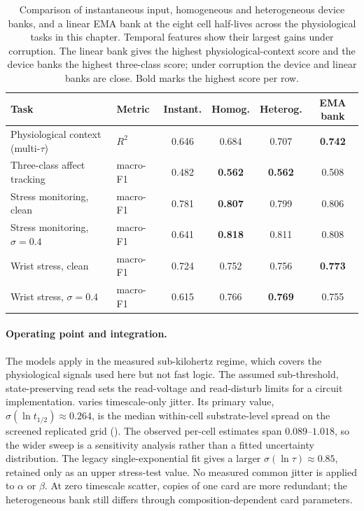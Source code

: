 \documentclass[12pt, twoside]{report}
\begin{document}
\begin{table}[t]
  \centering
  \small
  \caption[Fading memory, timescale spread, and linear controls across the physiological tasks]{Comparison of instantaneous input, homogeneous and heterogeneous device banks, and a linear EMA bank at the eight cell half-lives across the physiological tasks in this chapter. Temporal features show their largest gains under corruption. The linear bank gives the highest physiological-context score and the device banks the highest three-class score; under corruption the device and linear banks are close. Bold marks the highest score per row.}
  \label{tab:ch5_summary}
  \setlength{\tabcolsep}{4pt}
  \begin{tabularx}{\linewidth}{@{}>{\raggedright\arraybackslash}Xlcccc@{}}
    \toprule
    Task & Metric & Instant. & Homog. & Heterog. & EMA bank \\
    \midrule
    Physiological context (multi-$\tau$) & $R^2$       & 0.646 & 0.684 & 0.707 & \textbf{0.742} \\
    Three-class affect tracking          & macro-F1    & 0.482 & \textbf{0.562} & \textbf{0.562} & 0.508 \\
    Stress monitoring, clean             & macro-F1    & 0.781 & \textbf{0.807} & 0.799 & 0.806 \\
    Stress monitoring, $\sigma{=}0.4$    & macro-F1    & 0.641 & \textbf{0.818} & 0.811 & 0.808 \\
    Wrist stress, clean                  & macro-F1    & 0.724 & 0.752 & 0.756 & \textbf{0.773} \\
    Wrist stress, $\sigma{=}0.4$         & macro-F1    & 0.615 & 0.766 & \textbf{0.769} & 0.755 \\
    \bottomrule
  \end{tabularx}
\end{table}

\paragraph{Operating point and integration.} The models apply in the measured sub-kilohertz regime, which covers the physiological signals used here but not fast logic. The assumed sub-threshold, state-preserving read sets the read-voltage and read-disturb limits for a circuit implementation.  varies timescale-only jitter. Its primary value, \(\sigma(\ln t_{1/2})\approx\num{0.264}\), is the median within-cell substrate-level spread on the screened replicated grid (). The observed per-cell estimates span $0.089$--$1.018$, so the wider sweep is a sensitivity analysis rather than a fitted uncertainty distribution. The legacy single-exponential fit gives a larger \(\sigma(\ln\tau)\approx\num{0.85}\), retained only as an upper stress-test value. No measured common jitter is applied to $\alpha$ or $\beta$. At zero timescale scatter, copies of one card are more redundant; the heterogeneous bank still differs through composition-dependent card parameters.
\end{document}

